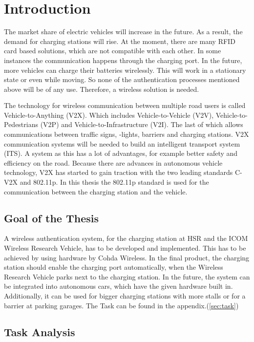 \chapter{Introduction}
The market share of electric vehicles will increase in the future. As a result, the demand for charging stations will rise. At the moment, there are many RFID card based solutions, which are not compatible with each other. In some instances the communication happens through the charging port. In the future, more vehicles can charge their batteries wirelessly. This will work in a stationary state or even while moving. So none of the authentication processes mentioned above will be of any use. Therefore, a wireless solution is needed.\cite{Aufgabenstellung}

The technology for wireless communication between multiple road users is called Vehicle-to-Anything (V2X). Which includes Vehicle-to-Vehicle (V2V), Vehicle-to-Pedestrians (V2P) and Vehicle-to-Infrastructure (V2I). The last of which allows communications between traffic signs, -lights, barriers and charging stations. V2X communication systems will be needed to build an intelligent transport system (ITS). A system as this has a lot of advantages, for example better safety and efficiency on the road. Because there are advances in autonomous vehicle technology, V2X has started to gain traction with the two leading standards C-V2X and 802.11p. In this thesis the 802.11p standard is used for the communication between the charging station and the vehicle. 
\cite{IEEE802.11p}

\section{Goal of the Thesis}

A wireless authentication system, for the charging station at HSR and the ICOM Wireless Research Vehicle, has to be developed and implemented. This has to be achieved by using hardware by Cohda Wireless. In the final product, the charging station should enable the charging port automatically, when the Wireless Research Vehicle parks next to the charging station. In the future, the system can be integrated into autonomous cars, which have the given hardware built in. Additionally, it can be used for bigger charging stations with more stalls or for a barrier at parking garages. The Task can be found in the appendix.(\ref{sec:task})

\section{Task Analysis}

